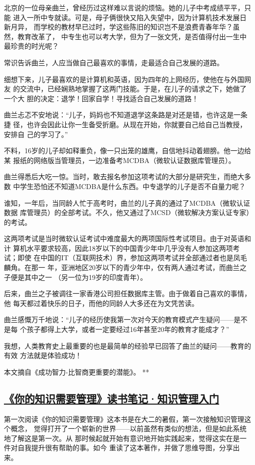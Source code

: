 \documentclass[11pt]{ctexart}
\begin{document}
{{{{北京的一位母亲曲兰，曾经历过这样难以言说的烦恼。她的儿子中考成绩平平，只能
进入一所中专就读。可是，母子俩很快又陷入失望中，因为计算机技术发展日新月异，
而学校的教材早已过时，学这些陈旧的知识岂不是浪费青春年华？虽然，教育改革了，
中专生也可以考大学，但为了一张文凭，是否值得付出一生中最珍贵的时光呢？


常识告诉曲兰，人应当做自己最喜欢的事情，走最适合自己发展的道路。

细想下来，儿子最喜欢的是计算机和英语，因为四年的上网经历，使他在与外国网友
的交流中，已经娴熟地掌握了这两门技能。于是，在儿子的请求之下，她做了一个大
胆的决定：退学！回家自学！寻找适合自己发展的道路！


曲兰忐忑不安地说：“儿子，妈妈也不知道退学这条路是对还是错，也许这是一条捷
径，也许会因此让你一生备受折磨。从现在开始，你就要自己给自己当教授，安排自
己的学习了。”


不料，16岁的儿子却如释重负，像一只出笼的雄鹰，自信地抖动着翅膀。他一边给某
报纸的网络版当管理员，一边准备考MCDBA（微软认证数据库管理员）。


曲兰得悉后大吃一惊。当时，敢去报名参加这项考试的大部分是研究生，而绝大多数
中学生恐怕还不知道MCDBA是什么东西。中专退学的儿子是否不自量力呢？


谁知，一年后，当同龄人忙于高考时，曲兰的儿子真的通过了MCDBA（微软认证数据
库管理员）的全部考试。不久，他又通过了MCSD（微软解决方案认证专家）的考试。


这两项考试是当时微软认证考试中难度最大的两项国际性考试项目。由于对英语和计
算机水平要求较高，因此18岁以下的中国青少年中几乎没有人参加这两项考试；即使
在中国的IT（互联网技术）界，参加这两项考试并全部通过者也是凤毛麟角。在那一
年，亚洲地区20岁以下的青少年中，仅有两人通过考试，而曲兰之子便是其中之一
（另一位为19岁的印度青年）。


后来，曲兰之子被调往一家香港公司担任数据库主管。由于做着自己喜欢的事情，他
每天都过着快乐的日子，而他的同龄人大多还在为文凭苦读。


曲兰感慨万千地说：“儿子的经历使我第一次对今天的教育模式产生疑问——是不是每
个孩子都得上大学，或者一定要经过16年甚至20年的教育才能成才？”




我想，人类教育史上最重要的也是最简单的经验早已回答了曲兰的疑问——教育的有效
方法就是体验成功！


本文摘自《成功智力-比智商更重要的潜能》。
**
\subsection{\href{http://www.jianshu.com/p/acb7a747ae39}{《你的知识需要管理》读书笔记·知识管理入门}}
\label{sec:org1bd191a}
第一次阅读《你的知识需要管理》这本书是在大二的暑假，第一次接触知识管理这个概念，
觉得打开了一个崭新的世界——以前虽然有类似的想法，但是如此系统地了解这是第一次。从
那时候起就开始有意识地开始实践起来，觉得这实在是一件对自我提升很有帮助的事。如今
重读了这本著作，并做了思维导图，分享出来。

}}}}
\end{document}
